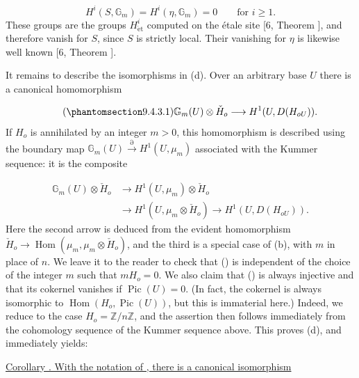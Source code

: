\begin{equation*}
H^i(S,\mathbb G_m)=H^i(\eta,\mathbb G_m)=0
\qquad\text{for }i\geq1.
\end{equation*}
These groups are the groups $H^i_{\mathrm{\acute et}}$ computed on the
étale site [6, Theorem ], and therefore vanish for $S$, since $S$ is
strictly local. Their vanishing for $\eta$ is likewise well known
[6, Theorem ].

It remains to describe the isomorphisms in (d). Over an arbitrary base $U$
there is a canonical homomorphism

\begin{equation}\tag{\SGARefTarget{sga7.sga7i.eix.n9-4-3-1}{9.4.3.1}}
\mathbb G_m(U)\otimes\check H_o
\longrightarrow H^1(U,D(H_{oU})).
\end{equation}
If $H_o$ is annihilated by an integer $m>0$, this homomorphism is described
using the boundary map
$\mathbb G_m(U)\xrightarrow{\partial}H^1(U,\mu_m)$ associated with the
Kummer sequence: it is the composite

\begin{equation*}
\begin{aligned}
\mathbb G_m(U)\otimes\check H_o
&\longrightarrow H^1(U,\mu_m)\otimes\check H_o\\
&\longrightarrow H^1(U,\mu_m\otimes\check H_o)
 \longrightarrow H^1(U,D(H_{oU})).
\end{aligned}
\end{equation*}
Here the second arrow is deduced from the evident homomorphism
$\check H_o\longrightarrow
\operatorname{Hom}(\mu_m,\mu_m\otimes\check H_o)$, and the third is a
special case of (b), with $m$ in place of $n$. We leave it to the reader to
check that () is independent of the choice of the integer $m$ such
that $mH_o=0$. We also claim that () is always injective and that its
cokernel vanishes if $\operatorname{Pic}(U)=0$. (In fact, the cokernel is
always isomorphic to $\operatorname{Hom}(H_o,\operatorname{Pic}(U))$, but
this is immaterial here.) Indeed, we reduce to the case
$H_o=\mathbb Z/n\mathbb Z$, and the assertion then follows immediately from
the cohomology sequence of the Kummer sequence above. This proves (d), and
immediately yields:

\medskip
\noindent
\underline{Corollary . With the notation of , there is a canonical
isomorphism}

